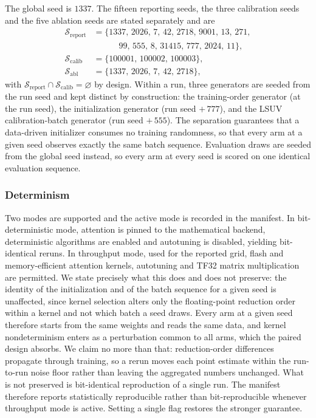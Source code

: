 \documentclass[final,5p,times,twocolumn]{elsarticle}
\theoremstyle{remark}
\begin{document}
The global seed is $1337$. The fifteen reporting seeds, the three calibration
seeds and the five ablation seeds are stated separately and are
\begin{align}
\label{eq:seeds}
\mathcal{S}_{\mathrm{report}} &= \{1337,\, 2026,\, 7,\, 42,\, 2718,\, 9001,\, 13,\, 271,
\nonumber\\ &\qquad\quad
99,\, 555,\, 8,\, 31415,\, 777,\, 2024,\, 11\}, \nonumber\\
\mathcal{S}_{\mathrm{calib}} &= \{100001,\, 100002,\, 100003\}, \\
\mathcal{S}_{\mathrm{abl}} &= \{1337,\, 2026,\, 7,\, 42,\, 2718\}, \nonumber
\end{align}
with $\mathcal{S}_{\mathrm{report}} \cap \mathcal{S}_{\mathrm{calib}} =
\varnothing$ by design. Within a run, three
generators are seeded from the run seed and kept distinct by construction: the
training-order generator (at the run seed), the initialization generator (run
seed $+\,777$), and the LSUV calibration-batch generator (run seed $+\,555$).
The separation guarantees that a data-driven initializer consumes no training
randomness, so that every arm at a given seed observes exactly the same batch
sequence. Evaluation draws are seeded from the global seed instead, so every
arm at every seed is scored on one identical evaluation sequence.

\subsubsection{Determinism}

Two modes are supported and the active mode is recorded in the manifest. In
bit-deterministic mode, attention is pinned to the mathematical backend,
deterministic algorithms are enabled and autotuning is disabled, yielding
bit-identical reruns. In throughput mode, used for the reported grid, flash
and memory-efficient attention kernels, autotuning and TF32 matrix multiplication
are permitted. We state precisely what this does and does not preserve: the
identity of the initialization and of the batch sequence for a given seed is
unaffected, since kernel selection alters only the floating-point reduction order
within a kernel and not which batch a seed draws. Every arm at a given seed
therefore starts from the same weights and reads the same data, and kernel
nondeterminism enters as a perturbation common to all arms, which the paired
design absorbs. We claim no more than that: reduction-order differences
propagate through training, so a rerun moves each point estimate within the
run-to-run noise floor rather than leaving the aggregated numbers unchanged.
What is not preserved is bit-identical reproduction of a single run. The manifest
therefore reports statistically reproducible rather than
bit-reproducible whenever throughput mode is active. Setting a single
flag restores the stronger guarantee.
\end{document}
